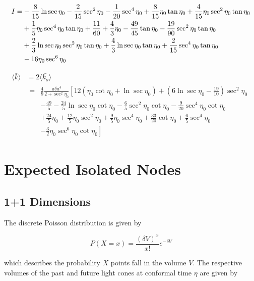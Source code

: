 \documentclass[12pt]{article}
\begin{document}
\begin{align}
I = &-\frac{8}{15}\ln\sec\eta_0 - \frac{2}{15}\sec^2\eta_0 - \frac{1}{20}\sec^4\eta_0 + \frac{8}{15}\eta_0\tan\eta_0 + \frac{4}{15}\eta_0\sec^2\eta_0\tan\eta_0 \notag \\
  & + \frac{1}{5}\eta_0\sec^4\eta_0\tan\eta_0 + \frac{11}{60} + \frac{4}{3}\eta_0 - \frac{49}{45}\tan\eta_0 - \frac{19}{90}\sec^2\eta_0\tan\eta_0 \notag \\
  & + \frac{2}{3}\ln\sec\eta_0\sec^2\eta_0\tan\eta_0 + \frac{4}{3}\ln\sec\eta_0\tan\eta_0 + \frac{2}{15}\sec^4\eta_0\tan\eta_0 \notag \\
  &- {1}{6}\eta_0\sec^6\eta_0
\end{align}

\begin{align}
\langle\bar{k}\rangle &= 2\langle\bar{k_o}\rangle \\
  &\begin{aligned}
    = &\frac{4}{9}\frac{\pi\delta a^4}{2+\sec^2\eta_0} \left[12\left(\eta_0\cot\eta_0 + \ln\sec\eta_0\right) + \left(6\ln\sec\eta_0 -\frac{19}{10}\right) \sec^2\eta_0 \right. \\
    & \left. - \frac{49}{5} - \frac{24}{5}\ln\sec\eta_0\cot\eta_0 - \frac{6}{5}\sec^2\eta_0\cot\eta_0 - \frac{9}{20}\sec^4\eta_0\cot\eta_0 \right. \\
    & \left. + \frac{24}{5}\eta_0 + \frac{12}{5}\eta_0\sec^2\eta_0 + \frac{9}{5}\eta_0\sec^4\eta_0 + \frac{33}{20}\cot\eta_0 + \frac{6}{5}\sec^4\eta_0 \right. \\
    & \left. - \frac{3}{2}\eta_0\sec^6\eta_0\cot\eta_0\right]
  \end{aligned}
\end{align}

\section{Expected Isolated Nodes}
\subsection{1+1 Dimensions}

The discrete Poisson distribution is given by

\begin{equation}
P(X=x) = \frac{\left(\delta V\right)^x}{x!}e^{-\delta V}
\end{equation}

which describes the probability $X$ points fall in the volume $V$.  The respective volumes of the past and future light cones at conformal time $\eta$ are given by
\end{document}
